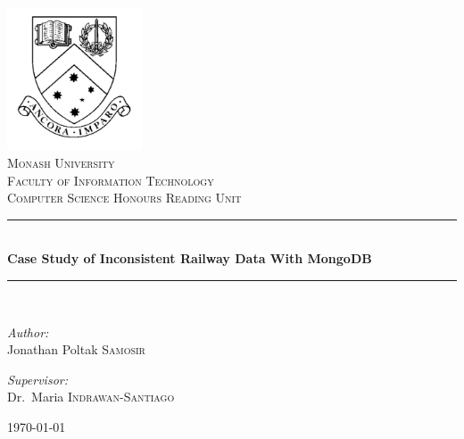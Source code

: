 \begin{titlepage}
\begin{center}


\includegraphics[width=0.3\textwidth]{img/MonashCrest.pdf}~\\[1cm]

\textsc{\LARGE Monash University}\\[1.5cm]
\textsc{\LARGE Faculty of Information Technology}\\[1cm]
\textsc{\Large Computer Science Honours Reading Unit}\\[0.5cm]         %

\rule{\linewidth}{0.5mm} \\[0.4cm]
{ \huge \bfseries Case Study of Inconsistent Railway Data With MongoDB \\[0.4cm] }   %

\rule{\linewidth}{0.5mm} \\[1.5cm]

\noindent
\begin{minipage}{0.4\textwidth}
\begin{flushleft} \large
\emph{Author:}\\
Jonathan Poltak \textsc{Samosir}
\end{flushleft}
\end{minipage}%
\begin{minipage}{0.4\textwidth}
\begin{flushright} \large
\emph{Supervisor:} \\
Dr.~Maria \textsc{Indrawan-Santiago}
\end{flushright}
\end{minipage}

\vfill

{\large \today}

\end{center}
\end{titlepage}